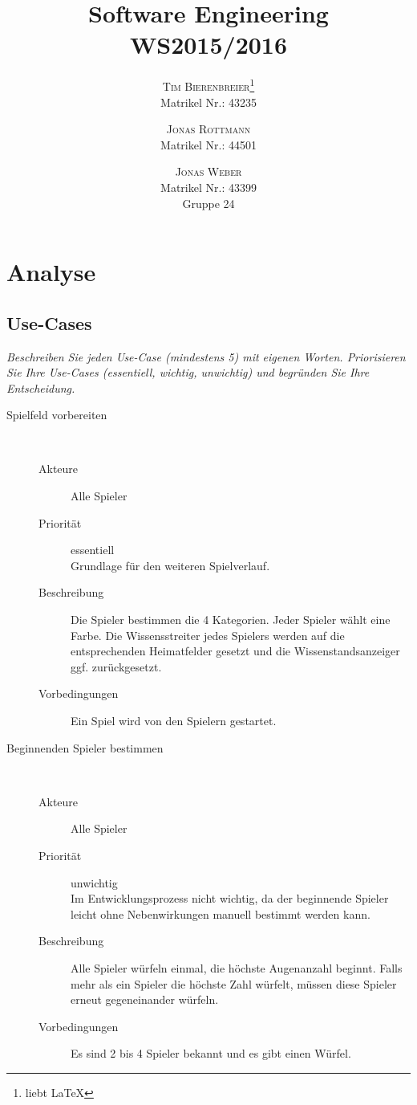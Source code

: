 \documentclass{report}
\title{Software Engineering\\\small{WS2015/2016}}
\author{
	\textsc{Tim Bierenbreier}\footnote{liebt \LaTeX}\\
	\normalsize Matrikel Nr.: 43235
	\and
	\textsc{Jonas Rottmann}\\
	\normalsize Matrikel Nr.: 44501
	\and
	\textsc{Jonas Weber}\\
	\normalsize Matrikel Nr.: 43399 \\[2cm]
	{\Huge Gruppe 24} \\[2cm]
}
\begin{document}
\maketitle

\tableofcontents

\chapter{Analyse}
\section{Use-Cases}
\textit{Beschreiben Sie jeden Use-Case (mindestens 5) mit eigenen Worten. Priorisieren Sie Ihre Use-Cases (essentiell, wichtig, unwichtig) und begr\"unden Sie Ihre Entscheidung.}
\begin{description}
   \item[Spielfeld vorbereiten]~\par
   \begin{description}
      \item[Akteure] Alle Spieler
      \item[Priorität] essentiell\\Grundlage für den weiteren Spielverlauf.
      \item[Beschreibung] Die Spieler bestimmen die 4 Kategorien. Jeder Spieler wählt eine Farbe. Die Wissensstreiter jedes Spielers werden auf die entsprechenden Heimatfelder gesetzt und die Wissenstandsanzeiger ggf. zurückgesetzt.
      \item[Vorbedingungen] Ein Spiel wird von den Spielern gestartet.
   \end{description}


   \item[Beginnenden Spieler bestimmen]~\par
   \begin{description}
      \item[Akteure] Alle Spieler
      \item[Priorität] unwichtig\\Im Entwicklungsprozess nicht wichtig, da der beginnende Spieler leicht ohne Nebenwirkungen manuell bestimmt werden kann.
      \item[Beschreibung] Alle Spieler würfeln einmal, die höchste Augenanzahl beginnt. Falls mehr als ein Spieler die höchste Zahl würfelt, müssen diese Spieler erneut gegeneinander würfeln.
      \item[Vorbedingungen] Es sind 2 bis 4 Spieler bekannt und es gibt einen Würfel.
   \end{description}



\end{description}
\end{document}
